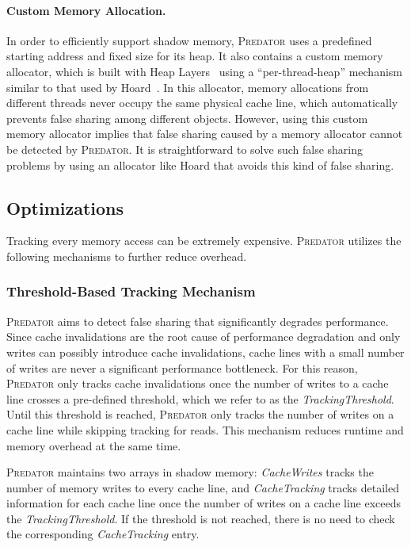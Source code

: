 \documentclass[10pt]{sigplanconf}
\newcommand{\Predator}{{\scshape Predator}}
\begin{document}
\paragraph{Custom Memory Allocation.} In order to efficiently support shadow memory, \Predator{} uses a predefined starting address and fixed size for its heap.  It also contains a custom memory allocator, which is built with Heap Layers~\cite{heaplayers} using a ``per-thread-heap'' mechanism similar to that used by Hoard~\cite{Hoard}.  In this allocator, memory allocations from different threads never occupy the same physical cache line, which automatically prevents false sharing among different objects.  However, using this custom memory allocator implies that false sharing caused by a memory allocator cannot be detected by \Predator{}. It is straightforward to solve such false sharing problems by using an allocator like Hoard that avoids this kind of false sharing.


\subsection{Optimizations}
\label{optimization}
Tracking every memory access can be extremely expensive.  
\Predator{} utilizes the following mechanisms to further reduce overhead.

\subsubsection{Threshold-Based Tracking Mechanism}
\label{sec:thresholdtracking}
\Predator{} aims to detect false sharing that significantly degrades performance. Since cache invalidations are the root cause of performance degradation and only writes 
can possibly introduce cache invalidations, 
cache lines with a small number of writes are never a significant performance bottleneck.
For this reason, \Predator{} only tracks cache invalidations
once the number of writes to a cache line crosses a
pre-defined threshold, which we refer to as the {\it TrackingThreshold}. 
Until this threshold is reached, \Predator{} only tracks the number of writes on a cache line 
while skipping tracking for reads.
This mechanism reduces runtime and memory overhead
at the same time.

\Predator{} maintains two arrays in shadow memory: 
{\it CacheWrites} tracks the number of memory writes to every cache line, and
{\it CacheTracking} tracks detailed information 
for each cache line once the number of writes on a cache line exceeds
the {\it TrackingThreshold}. 
If the threshold is not reached, there is no need to check the corresponding {\it CacheTracking} entry. 
\end{document}

